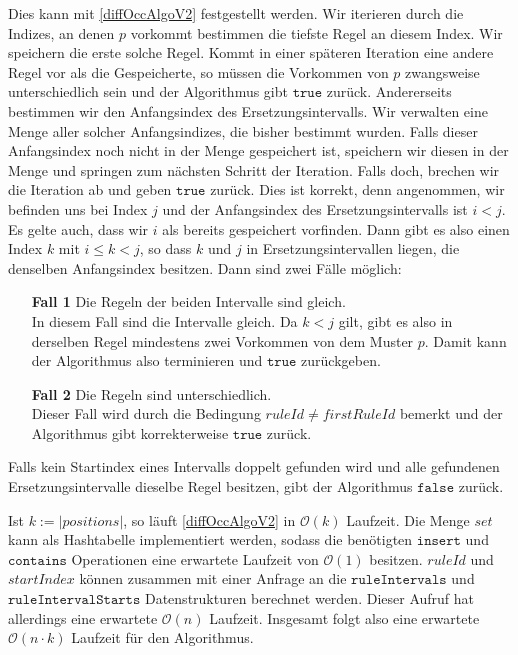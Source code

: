 Dies kann mit \autoref{diffOccAlgoV2} festgestellt werden.
Wir iterieren durch die Indizes, an denen $p$ vorkommt bestimmen die tiefste Regel an diesem Index. Wir speichern die erste solche Regel. Kommt in einer späteren Iteration eine andere Regel vor als die Gespeicherte, so müssen die Vorkommen von $p$ zwangsweise unterschiedlich sein und der Algorithmus gibt $\texttt{true}$ zurück.
Andererseits bestimmen wir den Anfangsindex des Ersetzungsintervalls. Wir verwalten eine Menge aller solcher Anfangsindizes, die bisher bestimmt wurden. 
Falls dieser Anfangsindex noch nicht in der Menge gespeichert ist, speichern wir diesen in der Menge und springen zum nächsten Schritt der Iteration. Falls doch, brechen wir die Iteration ab und geben $\texttt{true}$ zurück. 
Dies ist korrekt, denn angenommen, wir befinden uns bei Index $j$ und der Anfangsindex des Ersetzungsintervalls ist $i < j$. Es gelte auch, dass wir $i$ als bereits gespeichert vorfinden. Dann gibt es also einen Index $k$ mit $i \leq k < j$, so dass $k$ und $j$ in Ersetzungsintervallen liegen, die denselben Anfangsindex besitzen. Dann sind zwei Fälle möglich:

\begin{enumerate}
	\item[\textbf{Fall 1}] Die Regeln der beiden Intervalle sind gleich.\\
	In diesem Fall sind die Intervalle gleich. Da $k < j$ gilt, gibt es also in derselben Regel mindestens zwei Vorkommen von dem Muster $p$. Damit kann der Algorithmus also terminieren und $\texttt{true}$ zurückgeben.
	\item[\textbf{Fall 2}] Die Regeln sind unterschiedlich.\\
	Dieser Fall wird durch die Bedingung $ruleId \neq firstRuleId$ bemerkt und der Algorithmus gibt korrekterweise $\texttt{true}$ zurück.
\end{enumerate}

Falls kein Startindex eines Intervalls doppelt gefunden wird und alle gefundenen Ersetzungsintervalle dieselbe Regel besitzen, gibt der Algorithmus $\texttt{false}$ zurück.

Ist $k := |positions|$, so läuft \autoref{diffOccAlgoV2} in $\mathcal{O}(k)$ Laufzeit. Die Menge $set$ kann als Hashtabelle implementiert werden, sodass die benötigten $\texttt{insert}$ und $\texttt{contains}$ Operationen eine erwartete Laufzeit von $\mathcal{O}(1)$ besitzen. $ruleId$ und $startIndex$ können zusammen mit einer Anfrage an die $\texttt{ruleIntervals}$ und $\texttt{ruleIntervalStarts}$ Datenstrukturen berechnet werden. Dieser Aufruf hat allerdings eine erwartete $\mathcal{O}(n)$ Laufzeit. Insgesamt folgt also eine erwartete $\mathcal{O}(n \cdot k)$ Laufzeit für den Algorithmus.

